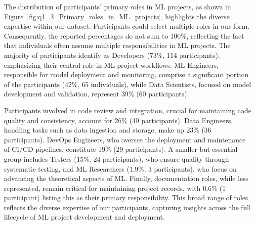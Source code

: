 

The distribution of participants' primary roles in ML projects, as shown in Figure~\ref{fig:q1_3_Primary_roles_in_ML_projects}, highlights the diverse expertise within our dataset.
Participants could select multiple roles in our form. Consequently, the reported percentages do not sum to 100\%, reflecting the fact that individuals often assume multiple responsibilities in ML projects.
The majority of participants identify as Developers (73\%, 114 participants), emphasizing their central role in ML project workflows. ML Engineers, responsible for model deployment and monitoring, comprise a significant portion of the participants (42\%, 65 individuals), while Data Scientists, focused on model development and validation, represent 39\% (60 participants).

Participants involved in code review and integration, crucial for maintaining code quality and consistency, account for 26\% (40 participants). Data Engineers, handling tasks such as data ingestion and storage, make up 23\% (36 participants). DevOps Engineers, who oversee the deployment and maintenance of CI/CD pipelines, constitute 19\% (29 participants). A smaller but essential group includes Testers (15\%, 24 participants), who ensure quality through systematic testing, and ML Researchers (1.9\%, 3 participants), who focus on advancing the theoretical aspects of ML. Finally, documentation roles, while less represented, remain critical for maintaining project records, with 0.6\% (1 participant) listing this as their primary responsibility.
This broad range of roles reflects the diverse expertise of our participants, capturing insights across the full lifecycle of ML project development and deployment.

